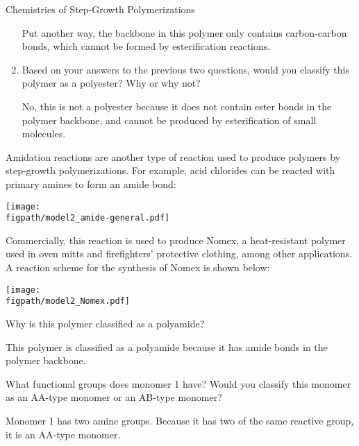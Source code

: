 \begin{activity}{Chemistries of Step-Growth Polymerizations}
\begin{ctqs}
\begin{enumerate}
\begin{solution}[2in]
					Put another way, the backbone in this polymer only contains carbon-carbon bonds, which cannot be formed by esterification reactions.
				\end{solution}
			
			\item Based on your answers to the previous two questions, would you classify this polymer as a polyester?  Why or why not?
			
				\begin{solution}[2in]
					No, this is not a polyester because it does not contain ester bonds in the polymer backbone, and cannot be produced by esterification of small molecules.
				\end{solution}
			
		\end{enumerate}
		
\end{ctqs}
	

\clearpage
\begin{model}

Amidation reactions are another type of reaction used to produce polymers by step-growth polymerizations.
For example, acid chlorides can be reacted with primary amines to form an amide bond:
	
	\centerline{\texttt{[image: \\figpath/model2\_amide-general.pdf]}}

Commercially, this reaction is used to produce Nomex, a heat-resistant polymer used in oven mitts and firefighters' protective clothing, among other applications.
A reaction scheme for the synthesis of Nomex is shown below:
	
	\centerline{\texttt{[image: \\figpath/model2\_Nomex.pdf]}}

\end{model}

\begin{ctqs}
		\question Why is this polymer classified as a polyamide?
			
				\begin{solution}[1.5in]
					This polymer is classified as a polyamide because it has amide bonds in the polymer backbone.
				\end{solution}
		
		\question What functional groups does monomer 1 have?   Would you classify this monomer as an AA-type monomer or an AB-type monomer?
			
				\begin{solution}[0.75in]
					Monomer 1 has two amine groups.  Because it has two of the same reactive group, it is an AA-type monomer.
				\end{solution}
		

\end{ctqs}
\end{activity}
